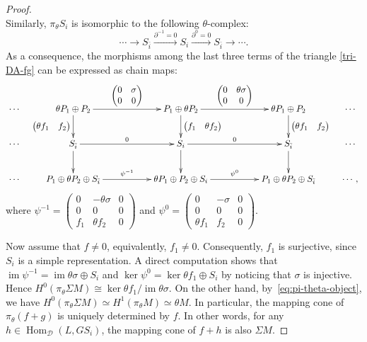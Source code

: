 \documentclass[12pt,reqno]{amsart}
\numberwithin{equation}{section}
\newcommand{\Hom}{\operatorname{Hom}\nolimits}
\begin{document}
\begin{proof}
\[		\]
		Similarly, $\pi_\theta S_i$ is isomorphic to the following $\theta$-complex:
		\[
		\cdots\rightarrow S_{\bar{i}}\xrightarrow{\partial^{-1}=0}S_i\xrightarrow{\partial^0=0} S_{\bar{i}}\rightarrow \cdots.
		\]
		As a consequence, the morphisms among the last three terms of the triangle \eqref{tri-DA-fg} can be expressed as chain maps:
		\[
		\xymatrix{ 
			\cdots &
			{\theta P_1\oplus P_2}
			\ar[d]_{  \begin{pmatrix}     
					\theta f_1 & f_2 
			\end{pmatrix}} 
			\ar[rr]^{
				\begin{pmatrix}     
					0 & \sigma \\
					0 &0
			\end{pmatrix}}  
			& & {P_1\oplus\theta P_2}
			\ar[d]^{
				\begin{pmatrix}     
					f_1 & \theta f_2 
			\end{pmatrix}}\ar[rr]^{\begin{pmatrix}     
					0 & \theta\sigma \\
					0 &0
			\end{pmatrix}}& &\theta P_1\oplus P_2 \ar[d]^{\begin{pmatrix}     
					\theta f_1 &  f_2 
			\end{pmatrix}} &\cdots \\
			\cdots &
			{S_{\bar i}}\ar[d]\ar[rr]^0 &&  {S_i}\ar[d]\ar[rr]^0& &S_{\bar{i}}\ar[d] &\cdots \\
			\cdots &
			{P_1\oplus \theta P_2\oplus S_{\bar i}} 
			\ar[rr]^{
				\psi^{-1}
			} 
			& & \theta P_1\oplus P_2\oplus S_i\ar[rr]^{\psi^0} &&{P_1\oplus \theta P_2\oplus S_{\bar i}}& \cdots,
		}
		\]
		where 
		$\psi^{-1}=\begin{pmatrix}         0 & -\theta \sigma & 0  \\         0 & 0 & 0\\          f_1 & \theta f_2 & 0     \end{pmatrix}$ and $\psi^0=\begin{pmatrix}         0 & -\sigma & 0  \\         0 & 0 & 0\\          \theta f_1 &  f_2 & 0     \end{pmatrix}$.
		
		Now assume that $f\neq 0$, equivalently, $f_1\neq 0$. Consequently, $f_1$ is surjective, since $S_i$ is a simple representation. A direct computation shows that $\operatorname{im} \psi^{-1}=\operatorname{im} \theta \sigma \oplus S_i$ and $\ker  \psi^0=\ker \theta f_1\oplus S_i$ by noticing that $\sigma$ is injective. Hence $H^0(\pi_\theta \Sigma M)\cong \ker\theta f_1/\operatorname{im} \theta\sigma$. On the other hand, by~\eqref{eq:pi-theta-object}, we have
		$H^0(\pi_\theta \Sigma M)\simeq H^1(\pi_\theta M)\simeq \theta M$. In particular, the mapping cone of $\pi_\theta(f+g)$ is uniquely determined by $f$. In other words, for any $h\in \Hom_\mathcal{D}(L,GS_i)$, the mapping cone of $f+h$ is also $\Sigma M$.
		

\end{proof}
\end{document}
